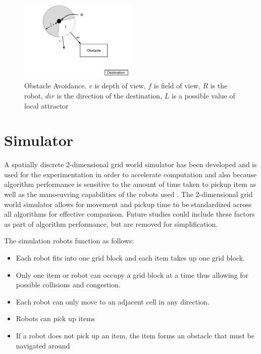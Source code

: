 \begin{figure}
	\centering
	\includegraphics[width=0.5\textwidth]{chapters/chapter5/figures/ObstacleAvoidance.pdf}
	\caption{Obstacle Avoidance. $v$ is depth of view, $f$ is field of view, $R$ is the robot, $dir$ is the direction of the destination, $L$ is a possible value of local attractor}
	\label{fig:obstacleavoidance}
\end{figure}


\section{Simulator}
\label{simulator}
A spatially discrete 2-dimensional grid world simulator has been developed and is used for the experimentation in order to accelerate computation \cite{sugawara2002swarming} and also because algorithm performance is sensitive to the amount of time taken to pickup item as well as the manoeuvring capabilities of the robots used \cite{ostergaard2001emergent}. The 2-dimensional grid world simulator allows for movement and pickup time to be standardized across all algorithms for effective comparison. Future studies could include these factors as part of algorithm performance, but are removed for simplification. 

The simulation robots function as follows:
\begin{itemize}
	\item Each robot fits into one grid block and each item takes up one grid block. 
	\item Only one item or robot can occupy a grid block at a time thus allowing for possible collisions and congestion. 
	\item Each robot can only move to an adjacent cell in any direction.
	\item Robots can pick up items
	\item If a robot does not pick up an item, the item forms an obstacle that must be navigated around
\end{itemize}


